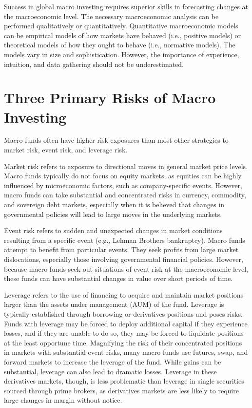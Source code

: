 \documentclass[11pt]{article}
\begin{document}
Success in global macro investing requires superior skills in forecasting changes at the macroeconomic level. The necessary macroeconomic analysis can be performed qualitatively or quantitatively. Quantitative macroeconomic models can be empirical models of how markets have behaved (i.e., positive models) or theoretical models of how they ought to behave (i.e., normative models). The models vary in size and sophistication. However, the importance of experience, intuition, and data gathering should not be underestimated.

\section*{Three Primary Risks of Macro Investing}
Macro funds often have higher risk exposures than most other strategies to market risk, event risk, and leverage risk.

Market risk refers to exposure to directional moves in general market price levels. Macro funds typically do not focus on equity markets, as equities can be highly influenced by microeconomic factors, such as company-specific events. However, macro funds can take substantial and concentrated risks in currency, commodity, and sovereign debt markets, especially when it is believed that changes in governmental policies will lead to large moves in the underlying markets.

Event risk refers to sudden and unexpected changes in market conditions resulting from a specific event (e.g., Lehman Brothers bankruptcy). Macro funds attempt to benefit from particular events. They seek profits from large market dislocations, especially those involving governmental financial policies. However, because macro funds seek out situations of event risk at the macroeconomic level, these funds can have substantial changes in value over short periods of time.

Leverage refers to the use of financing to acquire and maintain market positions larger than the assets under management (AUM) of the fund. Leverage is typically established through borrowing or derivatives positions and poses risks. Funds with leverage may be forced to deploy additional capital if they experience losses, and if they are unable to do so, they may be forced to liquidate positions at the least opportune time. Magnifying the risk of their concentrated positions in markets with substantial event risks, many macro funds use futures, swap, and forward markets to increase the leverage of the fund. While gains can be substantial, leverage can also lead to dramatic losses. Leverage in these derivatives markets, though, is less problematic than leverage in single securities sourced through prime brokers, as derivatives markets are less likely to require large changes in margin without notice.
\end{document}
